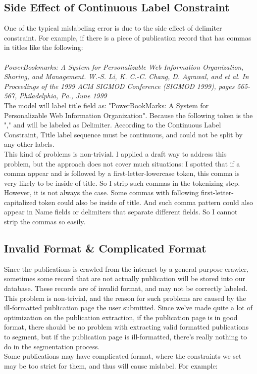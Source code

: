 \documentclass[11pt]{article}
\begin{document}
\subsection{Side Effect of Continuous Label Constraint}
One of the typical mislabeling error is due to the side effect of delimiter constraint. For example, if there is a piece of publication record that has commas in titles like the following:\\\\
\textit{
	PowerBookmarks: A System for Personalizable Web Information Organization, Sharing, and Management. W.-S. Li, K. C.-C. Chang, D. Agrawal, and et al. In Proceedings of the 1999 ACM SIGMOD Conference (SIGMOD 1999), pages 565-567, Philadelphia, Pa., June 1999
}\\

The model will label title field as: "PowerBookMarks: A System for Personalizable Web Information Organization". Because the following token is the "," and will be labeled as Delimiter. According to the Continuous Label Constraint, Title label sequence must be continuous, and could not be split by any other labels. \\

This kind of problems is non-trivial. I applied a draft way to address this problem, but the approach does not cover much situations: I spotted that if a comma appear and is followed by a first-letter-lowercase token, this comma is very likely to be inside of title. So I strip such commas in the tokenizing step. However, it is not always the case. Some commas with following first-letter-capitalized token could also be inside of title. And such comma pattern could also appear in Name fields or delimiters that separate different fields. So I cannot strip the commas so easily. 

\subsection{Invalid Format \& Complicated Format}
Since the publications is crawled from the internet by a general-purpose crawler, sometimes some record that are not actually publication will be stored into our database. These records are of invalid format, and may not be correctly labeled. This problem is non-trivial, and the reason for such problems are caused by the ill-formatted publication page the user submitted. Since we've made quite a lot of optimization on the publication extraction, if the publication page is in good format, there should be no problem with extracting valid formatted publications to segment, but if the publication page is ill-formatted, there's really nothing to do in the segmentation process. \\
Some publications may have complicated format, where the constraints we set may be too strict for them, and thus will cause mislabel. For example:\\
\end{document}
